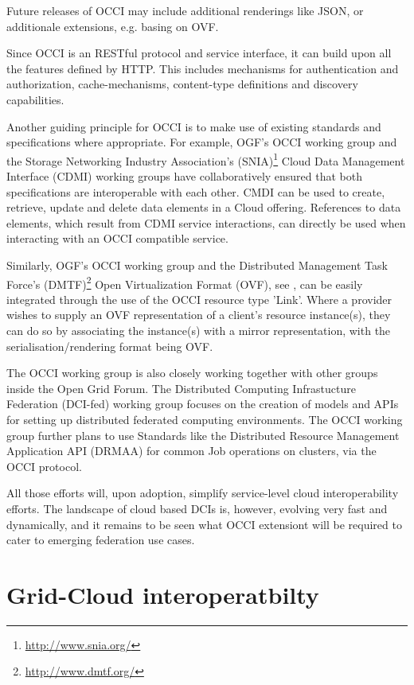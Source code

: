 \documentclass[10pt,conference,final,letterpaper,twoside,twocolumn,]{IEEEtran}
\begin{document}
 Future releases of OCCI may include additional renderings like JSON,
 or additionale extensions, e.g. basing on OVF.

 Since OCCI is an RESTful protocol and service interface, it can build
 upon all the features defined by HTTP. This includes mechanisms for
 authentication and authorization, cache-mechanisms, content-type
 definitions and discovery capabilities.
 
 Another guiding principle for OCCI is to make use of existing
 standards and specifications where appropriate.  For example, OGF's
 OCCI working group and the Storage Networking Industry Association's
 (SNIA)\footnote{\url{http://www.snia.org/}} Cloud Data Management
 Interface (CDMI) working groups have collaboratively ensured that
 both specifications are interoperable with each other.  CMDI can be
 used to create, retrieve, update and delete data elements in a Cloud
 offering. References to data elements, which result from CDMI service
 interactions, can directly be used when interacting with an OCCI
 compatible service.
 
 Similarly, OGF's OCCI working group and the Distributed Management
 Task Force's (DMTF)\footnote{\url{http://www.dmtf.org/}} Open
 Virtualization Format (OVF), see \cite{CDG+2009}, can be easily
 integrated through the use of the OCCI resource type 'Link'.  Where a
 provider wishes to supply an OVF representation of a client's
 resource instance(s), they can do so by associating the instance(s)
 with a mirror representation, with the serialisation/rendering format
 being OVF.
 
 The OCCI working group is also closely working together with other
 groups inside the Open Grid Forum. The Distributed Computing
 Infrastucture Federation (DCI-fed) working group focuses on the
 creation of models and APIs for setting up distributed federated
 computing environments. The OCCI working group further plans to use
 Standards like the Distributed Resource Management Application API
 (DRMAA) for common Job operations on clusters, via the OCCI protocol.
 
 All those efforts will, upon adoption, simplify service-level cloud
 interoperability efforts.  The landscape of cloud based DCIs is,
 however, evolving very fast and dynamically, and it remains to be
 seen what OCCI extensiont will be required to cater to emerging
 federation use cases.
 
 
 \section{Grid-Cloud interoperatbilty}
 \label{sec:gcinterop}
 
\end{document}
